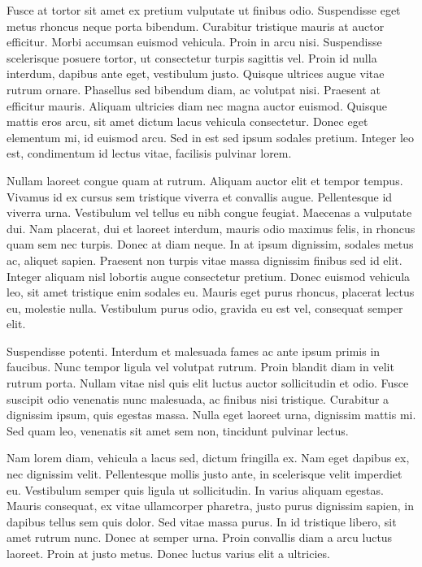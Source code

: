 \documentclass{article}
\begin{document}
Fusce at tortor sit amet ex pretium vulputate ut finibus odio. Suspendisse eget metus rhoncus neque porta bibendum. Curabitur tristique mauris at auctor efficitur. Morbi accumsan euismod vehicula. Proin in arcu nisi. Suspendisse scelerisque posuere tortor, ut consectetur turpis sagittis vel. Proin id nulla interdum, dapibus ante eget, vestibulum justo. Quisque ultrices augue vitae rutrum ornare. Phasellus sed bibendum diam, ac volutpat nisi. Praesent at efficitur mauris. Aliquam ultricies diam nec magna auctor euismod. Quisque mattis eros arcu, sit amet dictum lacus vehicula consectetur. Donec eget elementum mi, id euismod arcu. Sed in est sed ipsum sodales pretium. Integer leo est, condimentum id lectus vitae, facilisis pulvinar lorem.

Nullam laoreet congue quam at rutrum. Aliquam auctor elit et tempor tempus. Vivamus id ex cursus sem tristique viverra et convallis augue. Pellentesque id viverra urna. Vestibulum vel tellus eu nibh congue feugiat. Maecenas a vulputate dui. Nam placerat, dui et laoreet interdum, mauris odio maximus felis, in rhoncus quam sem nec turpis. Donec at diam neque. In at ipsum dignissim, sodales metus ac, aliquet sapien. Praesent non turpis vitae massa dignissim finibus sed id elit. Integer aliquam nisl lobortis augue consectetur pretium. Donec euismod vehicula leo, sit amet tristique enim sodales eu. Mauris eget purus rhoncus, placerat lectus eu, molestie nulla. Vestibulum purus odio, gravida eu est vel, consequat semper elit.

Suspendisse potenti. Interdum et malesuada fames ac ante ipsum primis in faucibus. Nunc tempor ligula vel volutpat rutrum. Proin blandit diam in velit rutrum porta. Nullam vitae nisl quis elit luctus auctor sollicitudin et odio. Fusce suscipit odio venenatis nunc malesuada, ac finibus nisi tristique. Curabitur a dignissim ipsum, quis egestas massa. Nulla eget laoreet urna, dignissim mattis mi. Sed quam leo, venenatis sit amet sem non, tincidunt pulvinar lectus.

Nam lorem diam, vehicula a lacus sed, dictum fringilla ex. Nam eget dapibus ex, nec dignissim velit. Pellentesque mollis justo ante, in scelerisque velit imperdiet eu. Vestibulum semper quis ligula ut sollicitudin. In varius aliquam egestas. Mauris consequat, ex vitae ullamcorper pharetra, justo purus dignissim sapien, in dapibus tellus sem quis dolor. Sed vitae massa purus. In id tristique libero, sit amet rutrum nunc. Donec at semper urna. Proin convallis diam a arcu luctus laoreet. Proin at justo metus. Donec luctus varius elit a ultricies.
\end{document}
